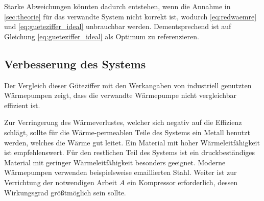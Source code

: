 Starke Abweichungen könnten dadurch entstehen, wenn die Annahme in \ref{sec:theorie} für das verwandte System nicht korrekt ist, wodurch \eqref{eq:redwaemre} und \eqref{eq:gueteziffer_ideal} unbrauchbar werden. 
Dementsprechend ist auf Gleichung \eqref{eq:gueteziffer_ideal} als Optimum zu referenzieren.

\subsection{Verbesserung des Systems}
Der Vergleich dieser Güteziffer mit den Werkangaben von industriell genutzten Wärmepumpen zeigt, dass die verwandte Wärmepumpe nicht vergleichbar effizient ist.

Zur Verringerung des Wärmeverlustes, welcher sich negativ auf die Effizienz schlägt, sollte für die Wärme-permeablen Teile des Systems ein Metall benutzt werden, welches die Wärme gut leitet.
Ein Material mit hoher Wärmeleitfähigkeit ist empfehlenswert.
Für den restlichen Teil des Systems ist ein druckbeständiges Material mit geringer Wärmeleitfähigkeit besonders geeignet.
Moderne Wärmepumpen verwenden beispielsweise emaillierten Stahl\cite{viessmann_VITOCAL161A}.
Weiter ist zur Verrichtung der notwendigen Arbeit $A$ ein Kompressor erforderlich, dessen Wirkungsgrad größtmöglich sein sollte.